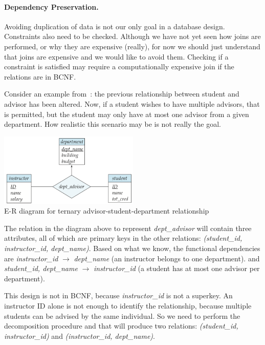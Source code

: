 \paragraph{Dependency Preservation.} Avoiding duplication of data is not our only goal in a database design. Constraints also need to be checked. Although we have not yet seen how joins are performed, or why they are expensive (really), for now we should just understand that joins are expensive and we would like to avoid them. Checking if a constraint is satisfied may require a computationally expensive join if the relations are in BCNF.

Consider an example from~\cite{dsc}: the previous relationship between student and advisor has been altered. Now, if a student wishes to have multiple advisors, that is permitted, but the student may only have at most one advisor from a given department. How realistic this scenario may be is not really the goal.

\begin{center}
\includegraphics[width=0.5\textwidth]{images/advise-3}\\
E-R diagram for ternary advisor-student-department relationship~\cite{dsc}
\end{center}

The relation in the diagram above to represent \textit{dept\_advisor} will contain three attributes, all of which are primary keys in the other relations: \textit{(student\_id, instructor\_id, dept\_name)}. Based on what we know, the functional dependencies are \textit{instructor\_id} $\rightarrow$ \textit{dept\_name} (an instructor belongs to one department). and \textit{student\_id, dept\_name} $\rightarrow$ \textit{instructor\_id} (a student has at most one advisor per department). 

This design is not in BCNF, because \textit{instructor\_id} is not a superkey. An instructor ID alone is not enough to identify the relationship, because multiple students can be advised by the same individual. So we need to perform the decomposition procedure and that will produce two relations: \textit{(student\_id, instructor\_id)} and \textit{(instructor\_id, dept\_name)}.

